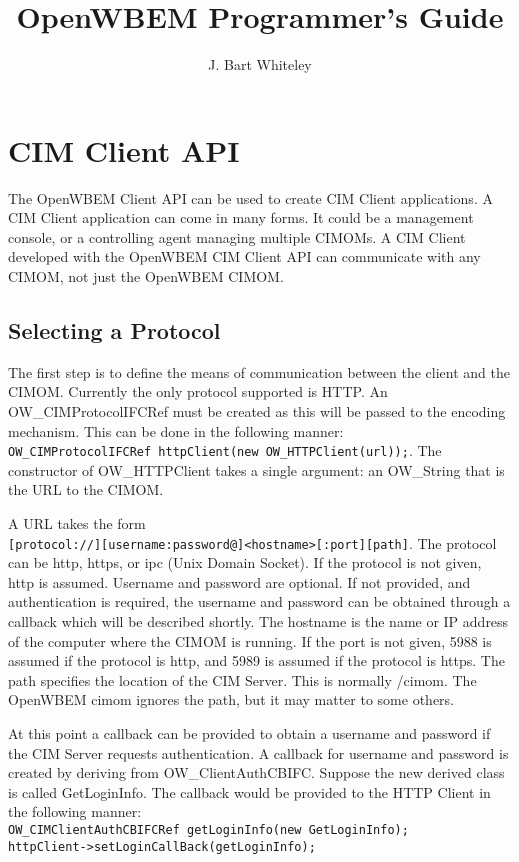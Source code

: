 \documentclass[letterpaper,10pt]{article}
\author {J. Bart Whiteley}
\title {OpenWBEM Programmer's Guide}
\begin{document}
\maketitle
\tableofcontents
\setlength{\parindent}{0pt}
\setlength{\parskip}{1ex plus 0.5ex minus 0.2ex}
\section{CIM Client API}
The OpenWBEM Client API can be used to create CIM Client applications.  
A CIM Client application can come in many forms.  It could be a management
console, or a controlling agent managing multiple CIMOMs.  A CIM Client 
developed with the OpenWBEM CIM Client API can communicate with any 
CIMOM, not just the OpenWBEM CIMOM.  
\subsection{Selecting a Protocol}
The first step is to define the means of communication between the
client and the CIMOM.  Currently the only protocol supported is 
HTTP.  An OW\_CIMProtocolIFCRef must be created as this will
be passed to the encoding mechanism.  This can be done in the
following manner: \\
\mbox{\texttt{OW\_CIMProtocolIFCRef httpClient(new OW\_HTTPClient(url));}}.
The constructor of 
OW\_HTTPClient takes a single argument: an OW\_String that is the 
URL to the CIMOM.  

A URL takes the form \\
\mbox{\texttt{[protocol://][username:password@]<hostname>[:port][path]}}.
The protocol can be http, https, or ipc (Unix Domain Socket).  If the
protocol is not given, http is assumed.  Username and password are optional.
If not provided, and authentication is required, the username
and password can be obtained through a callback which will be described 
shortly.  The hostname is the name or IP address of the computer where 
the CIMOM is running.  If the port is not given, 5988 is assumed if 
the protocol is http, and 5989 is assumed if the protocol is https.  
The path specifies the location of the CIM Server.  This is normally /cimom.
The OpenWBEM cimom ignores the path, but it may matter to some others.

At this point a callback can be provided to obtain a username and 
password if the CIM Server requests authentication.  A callback for 
username and password is created by deriving from OW\_ClientAuthCBIFC.
Suppose the new derived class is called GetLoginInfo.  The callback 
would be provided to the HTTP Client in the following manner: \\
\mbox{\texttt{OW\_CIMClientAuthCBIFCRef getLoginInfo(new GetLoginInfo);}}\\
\mbox{\texttt{httpClient->setLoginCallBack(getLoginInfo);}}
\end{document}
